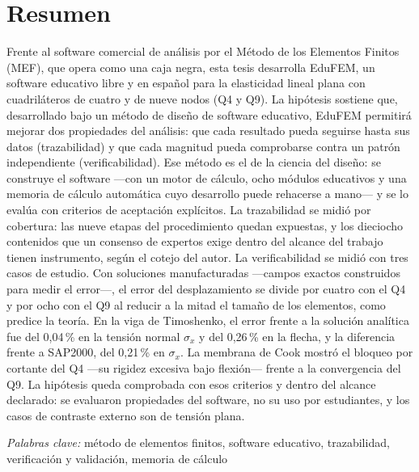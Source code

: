 \chapter*{Resumen}

\noindent Frente al software comercial de análisis por el Método de los Elementos Finitos (MEF), que opera como una caja negra, esta tesis desarrolla EduFEM, un software educativo libre y en español para la elasticidad lineal plana con cuadriláteros de cuatro y de nueve nodos (Q4 y Q9). La hipótesis sostiene que, desarrollado bajo un método de diseño de software educativo, EduFEM permitirá mejorar dos propiedades del análisis: que cada resultado pueda seguirse hasta sus datos (trazabilidad) y que cada magnitud pueda comprobarse contra un patrón independiente (verificabilidad). Ese método es el de la ciencia del diseño: se construye el software ---con un motor de cálculo, ocho módulos educativos y una memoria de cálculo automática cuyo desarrollo puede rehacerse a mano--- y se lo evalúa con criterios de aceptación explícitos. La trazabilidad se midió por cobertura: las nueve etapas del procedimiento quedan expuestas, y los dieciocho contenidos que un consenso de expertos exige dentro del alcance del trabajo tienen instrumento, según el cotejo del autor. La verificabilidad se midió con tres casos de estudio. Con soluciones manufacturadas ---campos exactos construidos para medir el error---, el error del desplazamiento se divide por cuatro con el Q4 y por ocho con el Q9 al reducir a la mitad el tamaño de los elementos, como predice la teoría. En la viga de Timoshenko, el error frente a la solución analítica fue del 0,04\,\% en la tensión normal $\sigma_x$ y del 0,26\,\% en la flecha, y la diferencia frente a SAP2000, del 0,21\,\% en $\sigma_x$. La membrana de Cook mostró el bloqueo por cortante del Q4 ---su rigidez excesiva bajo flexión--- frente a la convergencia del Q9. La hipótesis queda comprobada con esos criterios y dentro del alcance declarado: se evaluaron propiedades del software, no su uso por estudiantes, y los casos de contraste externo son de tensión plana.

\textit{Palabras clave:} método de elementos finitos, software educativo, trazabilidad, verificación y validación, memoria de cálculo

